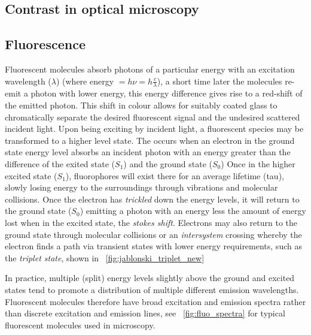 \subsection{Contrast in optical microscopy}
\subsection{Fluorescence}

Fluorescent molecules absorb photons of a particular energy with an excitation wavelength (\(\lambda \)) (where energy \(= h \nu = h \frac{c}{\lambda}\)), a short time later the molecules re-emit a photon with lower energy, this energy difference gives rise to a red-shift of the emitted photon.
This shift in colour allows for suitably coated glass to chromatically separate the desired fluorescent signal and the undesired scattered incident light.
Upon being exciting by incident light, a fluorescent species may be transformed to a higher level state.
The occurs when an electron in the ground state energy level absorbs an incident photon with an energy greater than the difference of the exited state (\(S_1\)) and the ground state (\(S_0\))
Once in the higher excited state (\(S_1\)), \gls{fluorophore}s will exist there for an average lifetime (\gls{tau}), slowly losing energy to the surroundings through vibrations and molecular collisions.
Once the electron has \emph{trickled} down the energy levels, it will return to the ground state (\(S_0 \)) emitting a photon with an energy less the amount of energy lost when in the excited state, the \emph{\Gls{stokes shift}}.
Electrons may also return to the ground state through molecular collisions or an \emph{intersystem} crossing whereby the electron finds a path via transient states with lower energy requirements, such as the \emph{triplet state}, shown in \figurename~\ref{fig:jablonski_triplet_new}

In practice, multiple (split) energy levels slightly above the ground and excited states tend to promote a distribution of multiple different emission wavelengths.
Fluorescent molecules therefore have broad excitation and emission spectra rather than discrete excitation and emission lines, see \figurename~\ref{fig:fluo_spectra} for typical fluorescent molecules used in microscopy.

